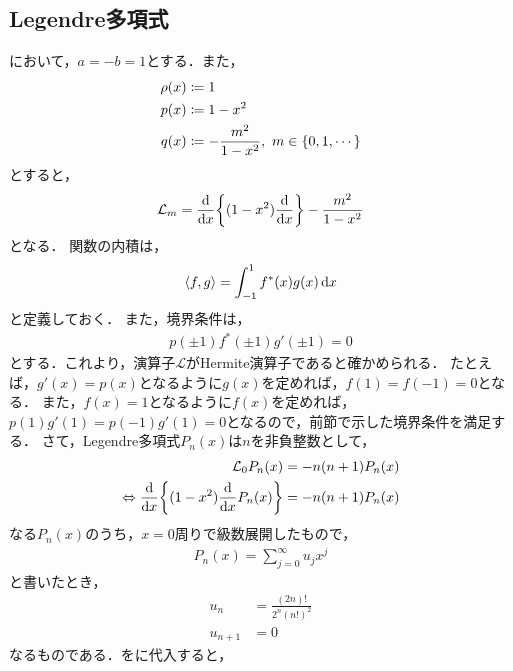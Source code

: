 \documentclass{report}
\begin{document}
  \subsection{Legendre多項式}
    において，$a = -b = 1$とする．また，
    \begin{align}
      \rho(x) &\coloneqq 1 \\ 
      p(x) &\coloneqq 1 - x^2 \\ 
      q(x) &\coloneqq -\frac{m^2}{1 - x^2},\ m\in \qty{0, 1, \cdots}
    \end{align}
    とすると，
    \begin{align}
      \mathcal{L}_m = \dv{x}\qty{(1 - x^2)\dv{x}} - \frac{m^2}{1 - x^2}
    \end{align}
    となる．
    関数の内積は，
    \begin{align}
      \left\langle f, g \right\rangle = \int_{-1}^{1} f^*(x)g(x) \dd{x} \label{inner-prod-legendre}
    \end{align}
    と定義しておく．
    また，境界条件は，
    \begin{align}
      p(\pm 1)f^*(\pm 1)g'(\pm 1) = 0
    \end{align}
    とする．これより，演算子$\mathcal{L}$がHermite演算子であると確かめられる．
    たとえば，$g'(x) = p(x)$となるように$g(x)$を定めれば，$f(1) = f(-1) = 0$となる．
    また，$f(x) = 1$となるように$f(x)$を定めれば，$p(1)g'(1) = p(-1)g'(1) = 0$となるので，前節で示した境界条件を満足する．
    さて，Legendre多項式$P_n(x)$は$n$を非負整数として，
    \begin{align}
      \mathcal{L}_0P_n(x) &= -n(n + 1) P_n(x) \\ 
      \Leftrightarrow \dv{x}\qty{(1 - x^2)\dv{x}P_n(x)} &= -n(n + 1)P_n(x)\label{legendre-polynominal} 
    \end{align}
    なる$P_n(x)$のうち，$x = 0$周りで級数展開したもので，
    \begin{align}
      P_n(x) = \sum_{j = 0}^{\infty}u_jx^j\label{legendre-polynominal-u-expantion}
    \end{align}
    と書いたとき，
    \begin{align}
      u_n &= \frac{(2n)!}{2^n(n!)^2}\label{legendre-polynominal-u-expantion-n} \\ 
      u_{n + 1} &= 0\label{legendre-polynominal-u-expantion-np1}
    \end{align}
    なるものである．をに代入すると，
\end{document}
